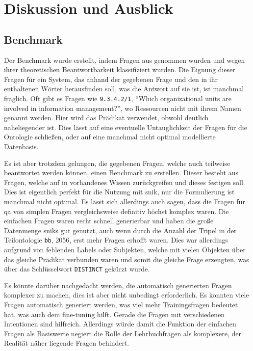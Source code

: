 \chapter{Diskussion und Ausblick}\label{ch:discussion}

\section{Benchmark}

Der Benchmark wurde erstellt, indem Fragen aus \citet{bb} genommen wurden und wegen ihrer theoretischen Beantwortbarkeit klassifiziert wurden.
Die Eignung dieser Fragen für ein System, das anhand der gegebenen Frage und den in ihr enthaltenen Wörter herausfinden soll, was die Antwort auf sie ist, ist manchmal fraglich.
Oft gibt es Fragen wie \texttt{9.3.4.2/1}, \enquote{Which organizational units are involved in information management?}, wo Ressourcen nicht mit ihrem Namen genannt werden.
Hier wird das Prädikat  verwendet, obwohl  deutlich naheliegender ist.
Dies lässt auf eine eventuelle Untauglichkeit der Fragen für die Ontologie schließen, oder auf eine manchmal nicht optimal modellierte Datenbasis.

Es ist aber trotzdem gelungen, die gegebenen Fragen, welche auch teilweise beantwortet werden können, einen Benchmark zu erstellen.
Dieser besteht aus Fragen, welche auf in \citet{bb} vorhandenes Wissen zurückgreifen und dieses festigen soll.
Dies ist eigentlich perfekt für die Nutzung mit \ac{snik}, nur die Formulierung ist manchmal nicht optimal.
Es lässt sich allerdings auch sagen, dass die Fragen für \acl{qa} von simplen Fragen vergleichsweise definitiv höchst komplex waren.
Die einfachen Fragen waren recht schnell generierbar und haben die große Datenmenge \ac{snik}s gut genutzt,
auch wenn durch die Anzahl der Tripel in der Teilontologie \texttt{bb}, 2056, erst mehr Fragen erhofft waren.
Dies war allerdings aufgrund von fehlenden Labels oder Subjekten, welche mit vielen Objekten über das gleiche Prädikat verbunden waren und somit die gleiche Frage erzeugten,
was über das Schlüsselwort \texttt{DISTINCT} gekürzt wurde.

Es könnte darüber nachgedacht werden, die automatisch generierten Fragen komplexer zu machen, dies ist aber nicht unbedingt erforderlich.
Es konnten viele Fragen automatisch generiert werden, was viel mehr Trainingsfragen bedeutet hat, was auch dem fine-tuning hilft.
Gerade die Fragen mit verschiedenen Intentionen sind hilfreich.
Allerdings würde damit die Funktion der einfachen Fragen als Basiswerte negiert die Rolle der Lehrbuchfragen als komplexere, der Realität näher liegende Fragen behindert. 

